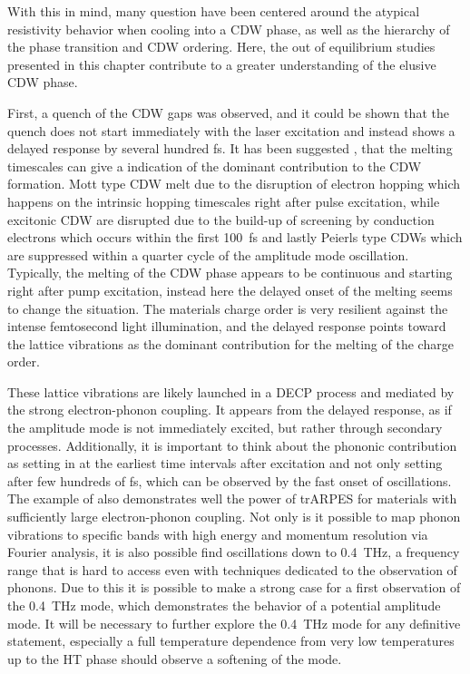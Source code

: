 With this in mind, many question have been centered around the atypical resistivity behavior when cooling into a CDW phase, as well as the hierarchy of the phase transition and CDW ordering.
Here, the out of equilibrium studies presented in this chapter contribute to a greater understanding of the elusive CDW phase. 

First, a quench of the CDW gaps was observed, and it could be shown that the quench does not start immediately with the laser excitation and instead shows a delayed response by several hundred \unit{\femto\second}.
It has been suggested \cite{hellmann_time-domain_2012}, that the melting timescales can give a indication of the dominant contribution to the CDW formation.
Mott type CDW melt due to the disruption of electron hopping which happens on the intrinsic hopping timescales right after pulse excitation, while excitonic CDW are disrupted due to the build-up of screening by conduction electrons which occurs within the first \qty{100}{\femto\second} and lastly Peierls type CDWs which are suppressed within a quarter cycle of the amplitude mode oscillation.
Typically, the melting of the CDW phase appears to be continuous and starting right after pump excitation, instead here the delayed onset of the melting seems to change the situation.
The materials charge order is very resilient against the intense femtosecond light illumination, and the delayed response points toward the lattice vibrations as the dominant contribution for the melting of the charge order. 

These lattice vibrations are likely launched in a DECP process and mediated by the strong electron-phonon coupling.
It appears from the delayed response, as if the amplitude mode is not immediately excited, but rather through secondary processes.
Additionally, it is important to think about the phononic contribution as setting in at the earliest time intervals after excitation and not only setting after few hundreds of \unit{\femto\second}, which can be observed by the fast onset of oscillations.
The example of  also demonstrates well the power of trARPES for materials with sufficiently large electron-phonon coupling.
Not only is it possible to map phonon vibrations to specific bands with high energy and momentum resolution via Fourier analysis, it is also possible find oscillations down to \qty{0.4}{\tera\hertz}, a frequency range that is hard to access even with techniques dedicated to the observation of phonons.
Due to this it is possible to make a strong case for a first observation of the \qty{0.4}{\tera\hertz} mode, which demonstrates the behavior of a potential amplitude mode.
It will be necessary to further explore the \qty{0.4}{\tera\hertz} mode for any definitive statement, especially a full temperature dependence from very low temperatures up to the HT phase should observe a softening of the mode.


